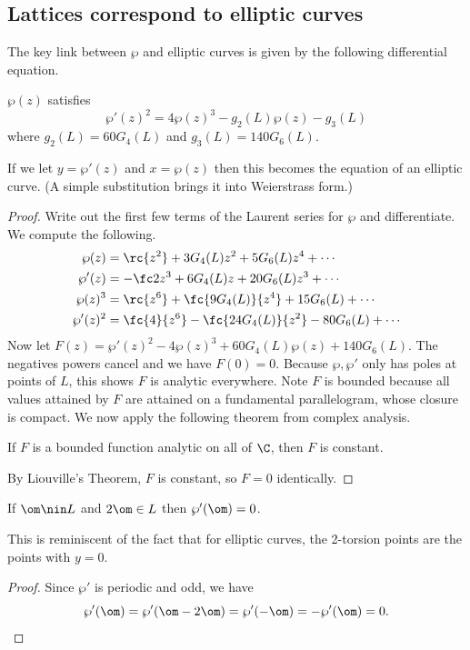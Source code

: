 \subsection{Lattices correspond to elliptic curves}\label{sec:corresp}
The key link between $\wp$ and elliptic curves is given by the following differential equation.
\begin{thm}
$\wp(z)$ satisfies
\begin{equation}\label{eq:wp-diffeq}
\wp'(z)^2=4\wp(z)^3-g_2(L)\wp(z)-g_3(L)
\end{equation}
where $g_2(L)=60G_4(L)$ and $g_3(L)=140G_6(L)$.
\end{thm}
If we let $y=\wp'(z)$ and $x=\wp(z)$ then this becomes the equation of an elliptic curve. (A simple substitution brings it into Weierstrass form.)
\begin{proof}
Write out the first few terms of the Laurent series for $\wp$ and differentiate. We compute the following.
\begin{align*}
\wp(z)&=\rc{z^2}+3G_4(L)z^2+5G_6(L)z^4+\cdots\\
\wp'(z)&=-\fc2{z^3}+6G_4(L)z+20G_6(L)z^3+\cdots\\
\wp(z)^3&=\rc{z^6}+\fc{9G_4(L)}{z^4}+15G_6(L)+\cdots\\
\wp'(z)^2&=\fc{4}{z^6}-\fc{24G_4(L)}{z^2}-80G_6(L)+\cdots 
\end{align*}
Now let $F(z)=\wp'(z)^2-4\wp(z)^3+60G_4(L)\wp(z)+140G_6(L)$. The negatives powers cancel and we have $F(0)=0$. Because $\wp,\wp'$ only has poles at points of $L$, this shows $F$ is analytic everywhere. Note $F$ is bounded because all values attained by $F$ are attained on a fundamental parallelogram, whose closure is compact. 
We now apply the following theorem from complex analysis.
\begin{thm}
If $F$ is a bounded function analytic on all of $\C$, then $F$ is constant.
\end{thm}
By Liouville's Theorem, $F$ is constant, so $F=0$ identically.
\end{proof}
\begin{lem}\label{lem:p-2-torsion}
If $\om\nin L$ and $2\om\in L$ then $\wp'(\om)=0$.
\end{lem}
This is reminiscent of the fact that for elliptic curves, the 2-torsion points are the points with $y=0$.
\begin{proof}
Since $\wp'$ is periodic and odd, we have
\[
\wp'(\om)=\wp'(\om-2\om)=\wp'(-\om)=-\wp'(\om)=0.
\]
\end{proof}

